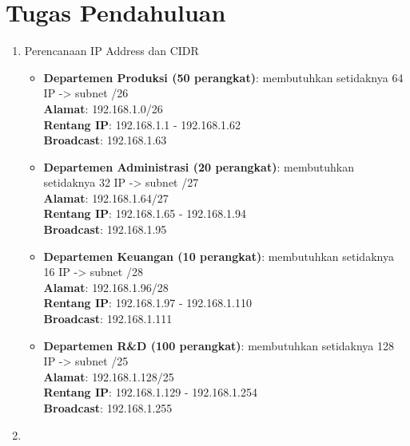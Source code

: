\section{Tugas Pendahuluan}

\begin{enumerate}
	\item Perencanaan IP Address dan CIDR
\begin{itemize}
  \item \textbf{Departemen Produksi (50 perangkat)}: membutuhkan setidaknya 64 IP -> subnet /26 \\
  \textbf{Alamat}: {192.168.1.0/26} \\
  \textbf{Rentang IP}: 192.168.1.1 - 192.168.1.62 \\
  \textbf{Broadcast}: 192.168.1.63

  \item \textbf{Departemen Administrasi (20 perangkat)}: membutuhkan setidaknya 32 IP -> subnet /27 \\
  \textbf{Alamat}: {192.168.1.64/27} \\
  \textbf{Rentang IP}: 192.168.1.65 - 192.168.1.94 \\
  \textbf{Broadcast}: 192.168.1.95

  \item \textbf{Departemen Keuangan (10 perangkat)}: membutuhkan setidaknya 16 IP -> subnet /28 \\
  \textbf{Alamat}: {192.168.1.96/28} \\
  \textbf{Rentang IP}: 192.168.1.97 - 192.168.1.110 \\
  \textbf{Broadcast}: 192.168.1.111

  \item \textbf{Departemen R\&D (100 perangkat)}: membutuhkan setidaknya 128 IP -> subnet /25 \\
  \textbf{Alamat}: {192.168.1.128/25} \\
  \textbf{Rentang IP}: 192.168.1.129 - 192.168.1.254 \\
  \textbf{Broadcast}: 192.168.1.255
\end{itemize}

	\item \begin{verbatim}
               

\end{verbatim}
\end{enumerate}
